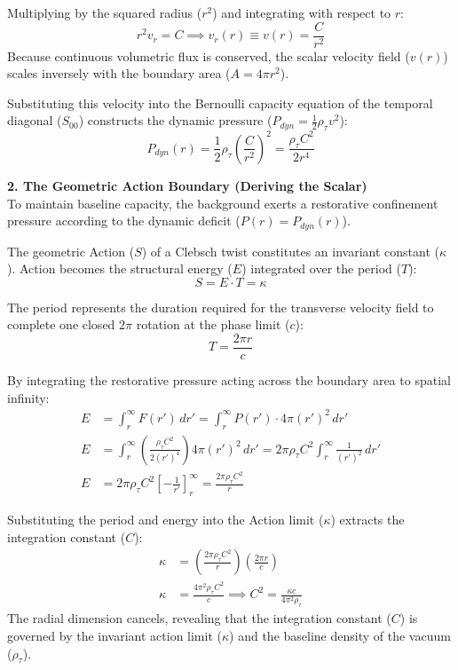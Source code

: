 Multiplying by the squared radius ($r^2$) and integrating with respect to $r$: 
\begin{equation}
r^2 v_r = C \implies v_r(r) \equiv v(r) = \frac{C}{r^2} 
\end{equation}
Because continuous volumetric flux is conserved, the scalar velocity field ($v(r)$) scales inversely with the boundary area ($A = 4\pi r^2$). 

Substituting this velocity into the Bernoulli capacity equation of the temporal diagonal ($S_{00}$) constructs the dynamic pressure ($P_{dyn} = \frac{1}{2}\rho_\tau v^2$):
\begin{equation}
    P_{dyn}(r) = \frac{1}{2}\rho_\tau \left( \frac{C}{r^2} \right)^2 = \frac{\rho_\tau C^2}{2 r^4}
\end{equation}

\textbf{2. The Geometric Action Boundary (Deriving the Scalar)} \\
To maintain baseline capacity, the background exerts a restorative confinement pressure according to the dynamic deficit ($P(r) = P_{dyn}(r)$). 

The geometric Action ($S$) of a Clebsch twist constitutes an invariant constant  ($\kappa$). Action becomes the structural energy ($E$) integrated over the period ($T$): 
\begin{equation}
    S = E \cdot T = \kappa
\end{equation}

The period represents the duration required for the transverse velocity field to complete one closed $2\pi$ rotation at the phase limit ($c$):
\begin{equation}
    T = \frac{2\pi r}{c}
\end{equation}

By integrating the restorative pressure acting across the boundary area to spatial infinity: 
\begin{align}
    E &= \int_r^\infty F(r') \, dr' = \int_r^\infty P(r') \cdot 4\pi (r')^2 \, dr' \nonumber \\
    E &= \int_r^\infty \left( \frac{\rho_\tau C^2}{2 (r')^4} \right) 4\pi (r')^2 \, dr' = 2\pi \rho_\tau C^2 \int_r^\infty \frac{1}{(r')^2} \, dr' \nonumber \\
    E &= 2\pi \rho_\tau C^2 \left[ -\frac{1}{r'} \right]_r^\infty = \frac{2\pi \rho_\tau C^2}{r}
\end{align}

Substituting the period and energy into the Action limit ($\kappa$) extracts the integration constant ($C$):
\begin{align}
    \kappa &= \left( \frac{2\pi \rho_\tau C^2}{r} \right) \left( \frac{2\pi r}{c} \right) \nonumber \\
    \kappa &= \frac{4\pi^2 \rho_\tau C^2}{c} \implies C^2 = \frac{\kappa c}{4\pi^2 \rho_\tau}
\end{align}
The radial dimension cancels, revealing that the integration constant ($C$) is governed by the invariant action limit ($\kappa$) and the baseline density of the vacuum ($\rho_\tau$).

